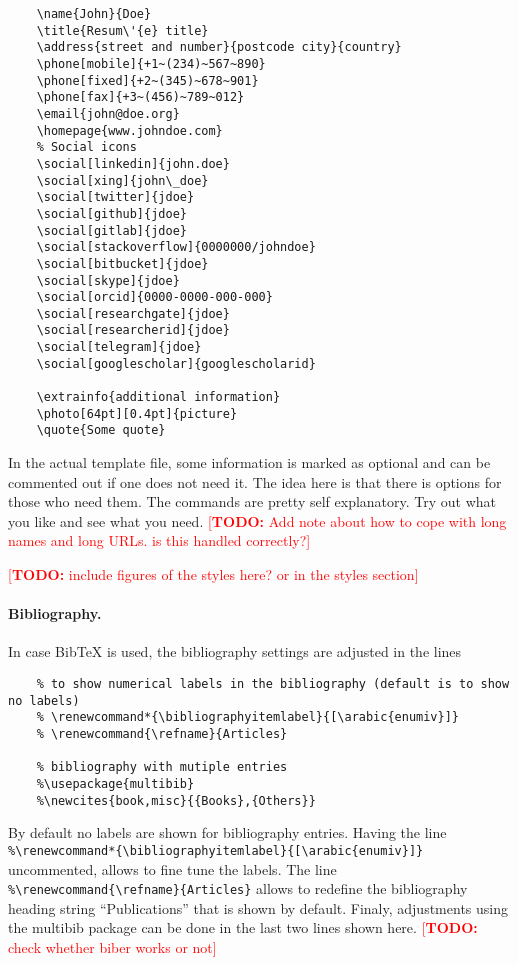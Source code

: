 \documentclass[a4paper,11pt]{article}
\newcommand{\todox}[1]{\textcolor{red}{[\textbf{TODO:} #1]}}
\begin{document}
\begin{lstlisting}
    \name{John}{Doe}
    \title{Resum\'{e} title}
    \address{street and number}{postcode city}{country}
    \phone[mobile]{+1~(234)~567~890}
    \phone[fixed]{+2~(345)~678~901}
    \phone[fax]{+3~(456)~789~012}
    \email{john@doe.org}
    \homepage{www.johndoe.com}
    % Social icons
    \social[linkedin]{john.doe}
    \social[xing]{john\_doe}               
    \social[twitter]{jdoe}                 
    \social[github]{jdoe}                  
    \social[gitlab]{jdoe}                  
    \social[stackoverflow]{0000000/johndoe}
    \social[bitbucket]{jdoe}               
    \social[skype]{jdoe}                   
    \social[orcid]{0000-0000-000-000}      
    \social[researchgate]{jdoe}            
    \social[researcherid]{jdoe}            
    \social[telegram]{jdoe}                
    \social[googlescholar]{googlescholarid}    

    \extrainfo{additional information}     
    \photo[64pt][0.4pt]{picture}
    \quote{Some quote}                     
\end{lstlisting}
In the actual template file, some information is marked as optional and can be commented out if one does not need it. 
The idea here is that there is options for those who need them. 
The commands are pretty self explanatory. Try out what you like and see what you need.
\todox{Add note about how to cope with long names and long URLs. is this handled correctly?}

\todox{include figures of the styles here? or in the styles section}

\paragraph{Bibliography.}
In case BibTeX is used, the bibliography settings are adjusted in the lines 
\begin{lstlisting}
    % to show numerical labels in the bibliography (default is to show no labels)
    % \renewcommand*{\bibliographyitemlabel}{[\arabic{enumiv}]}
    % \renewcommand{\refname}{Articles}

    % bibliography with mutiple entries
    %\usepackage{multibib}
    %\newcites{book,misc}{{Books},{Others}}
\end{lstlisting}
By default no labels are shown for bibliography entries. 
Having the line 
\lstinline!%\renewcommand*{\bibliographyitemlabel}{[\arabic{enumiv}]}! uncommented, 
allows to fine tune the labels. 
The line \lstinline!%\renewcommand{\refname}{Articles}! allows to redefine the bibliography heading string ``Publications'' that is shown by default. 
Finaly, adjustments using the multibib package can be done in the last two lines shown here. 
\todox{check whether biber works or not}
\end{document}
